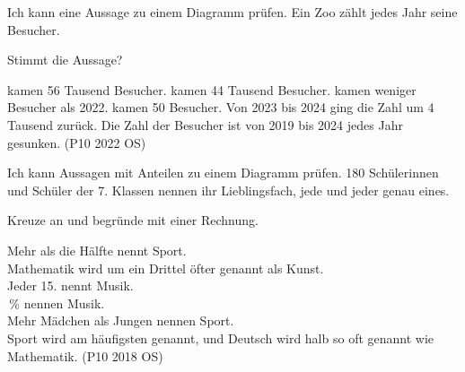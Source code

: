 \begin{aufgabe}{Ich kann eine Aussage zu einem Diagramm prüfen.}
Ein Zoo zählt jedes Jahr seine Besucher.


Stimmt die Aussage?
\begin{teile}
 kamen 56 Tausend Besucher. \hfill \janein
{} kamen 44 Tausend Besucher. \hfill \janein
{} kamen weniger Besucher als 2022. \hfill \janein
{} kamen 50 Besucher. \hfill \janein
\teil Von 2023 bis 2024 ging die Zahl um 4 Tausend zurück. \hfill \janein
\teil Die Zahl der Besucher ist von 2019 bis 2024 jedes Jahr gesunken. (P10 2022 OS) \hfill \janein
\end{teile}
\end{aufgabe}

\begin{aufgabe}{Ich kann Aussagen mit Anteilen zu einem Diagramm prüfen.}
180 Schülerinnen und Schüler der 7. Klassen nennen ihr Lieblingsfach, jede und jeder genau eines.


Kreuze an und begründe mit einer Rechnung.
\begin{teile}
\teil Mehr als die Hälfte nennt Sport.\\ \quad{}\quad{}
\teil Mathematik wird um ein Drittel öfter genannt als Kunst.\\ \quad{}\quad{}
\teil Jeder 15. nennt Musik.\\ \quad{}\quad{}
\,\% nennen Musik.\\ \quad{}\quad{}
\teil Mehr Mädchen als Jungen nennen Sport.\\ \quad{}\quad{}
\teil Sport wird am häufigsten genannt, und Deutsch wird halb so oft genannt wie Mathematik. (P10 2018 OS)\\ \quad{}\quad{}
\end{teile}
\end{aufgabe}

